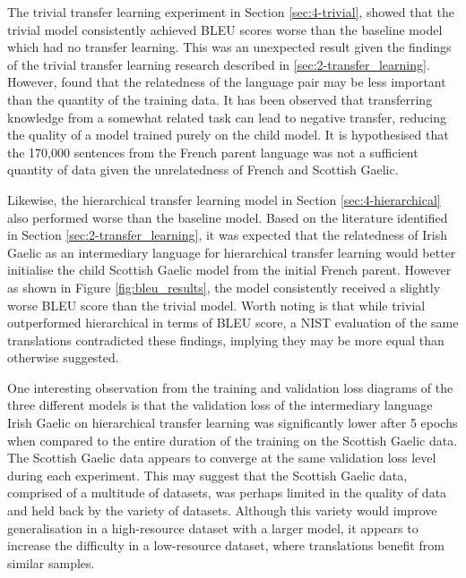The trivial transfer learning experiment in Section \ref{sec:4-trivial}, showed that the trivial model consistently achieved \acrshort{BLEU} scores worse than the baseline model which had no transfer learning. This was an unexpected result given the findings of the trivial transfer learning research described in \ref{sec:2-transfer_learning}.  
However, \cite{wang_negative_transfer_2019} found that the relatedness of the language pair may be less important than the quantity of the training data. It has been observed that transferring knowledge from a somewhat related task can lead to negative transfer, reducing the quality of a model trained purely on the child model. It is hypothesised that the 170,000 sentences from the French parent language was not a sufficient quantity of data given the unrelatedness of French and Scottish Gaelic.

Likewise, the hierarchical transfer learning model in Section \ref{sec:4-hierarchical} also performed worse than the baseline model. Based on the literature identified in Section \ref{sec:2-transfer_learning}, it was expected that the relatedness of Irish Gaelic as an intermediary language for hierarchical transfer learning would better initialise the child Scottish Gaelic model from the initial French parent. However as shown in Figure \ref{fig:bleu_results}, the model consistently received a slightly worse \acrshort{BLEU} score than the trivial model. Worth noting is that while trivial outperformed hierarchical in terms of \acrshort{BLEU} score, a \acrshort{NIST} evaluation of the same translations contradicted these findings, implying they may be more equal than otherwise suggested.

One interesting observation from the training and validation loss diagrams of the three different models is that the validation loss of the intermediary language Irish Gaelic on hierarchical transfer learning was significantly lower after 5 epochs when compared to the entire duration of the training on the Scottish Gaelic data. The Scottish Gaelic data appears to converge at the same validation loss level during each experiment. This may suggest that the Scottish Gaelic data, comprised of a multitude of datasets, was perhaps limited in the quality of data and held back by the variety of datasets. Although this variety would improve generalisation in a high-resource dataset with a larger model, it appears to increase the difficulty in a low-resource dataset, where translations benefit from similar samples.